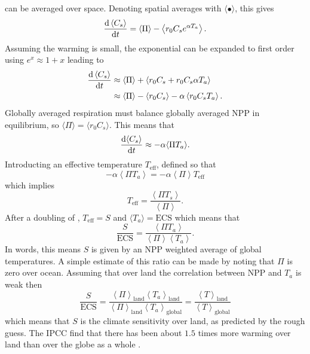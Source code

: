  can be averaged over space. Denoting spatial averages with $\langle \bullet \rangle$, this gives
\begin{equation}
  \label{eq:spatially_averaged_soil_carbon}
  \dv{\left\langle C_s\right\rangle}{t} = \left\langle \Pi \right \rangle - \left\langle r_0 C_s e^{\alpha T_a} \right \rangle.
\end{equation}
Assuming the warming is small, the exponential can be expanded to first order using $e^x \approx 1 + x$ leading to
\begin{align*}
  \dv{\left\langle C_s\right\rangle}{t} &\approx \left\langle \Pi \right \rangle  + \left\langle r_0 C_s + r_0 C_s \alpha T_a \right \rangle \\
                                        &\approx \left\langle \Pi \right \rangle - \left\langle r_0 C_s\right \rangle - \alpha \left \langle r_0C_s T_a\right\rangle.
\end{align*}
Globally averaged respiration must balance globally averaged NPP in equilibrium, so $\langle \Pi \rangle = \langle r_0 C_s \rangle$. This means that
\begin{equation}
  \label{eq:soil_carbon_linearised}
  \dv{\langle C_s\rangle}{t} \approx -\alpha \langle \Pi T_a \rangle.
\end{equation}
Introducting an effective temperature $T_{\mathrm{eff}}$, defined so that
\begin{equation}
  \label{eq:motivation_of_effective_temperature}
  - \alpha \left \langle \Pi T_a \right\rangle = - \alpha \left \langle \Pi \right\rangle T_{\mathrm{eff}}
\end{equation}
which implies
\begin{equation}
  \label{eq:definition_of_effective_temperature}
  T_{\mathrm{eff}} = \frac{\left \langle \Pi T_s \right\rangle}{\left \langle \Pi \right\rangle}.
\end{equation}
After a doubling of , $T_{\mathrm{eff}} = S$ and $\langle T_a \rangle = \mathrm{ECS}$ which means that
\begin{equation}
  \label{eq:S_vs_ECS}
  \frac{S}{\mathrm{ECS}} = \frac{\left \langle \Pi T_a \right\rangle}{\left \langle \Pi \right\rangle \left \langle T_a \right \rangle}.
\end{equation}
In words, this means $S$ is given by an NPP weighted average of global temperatures. A simple estimate of this ratio can be made by noting that $\Pi$ is zero over ocean.
Assuming that over land the correlation between NPP and $T_a$ is weak then
\begin{equation}
  \label{eq:S_vs_ECS_land_ocean}
  \frac{S}{\mathrm{ECS}}
  = \frac{\left\langle \Pi\right\rangle_{\mathrm{land}} \left\langle T_a \right\rangle_{\mathrm{land}}}{\left \langle \Pi \right\rangle_{\mathrm{land}} \left \langle T_a \right \rangle_{\mathrm{global}}}
  = \frac{\left\langle T\right\rangle_{\mathrm{land}}}{\left\langle T \right\rangle_{\mathrm{global}}}
\end{equation}
which means that $S$ is the climate sensitivity over land, as predicted by the rough guess. The IPCC find that there has been about $1.5$ times more warming over land than over the globe
as a whole \parencite{AR6}.

